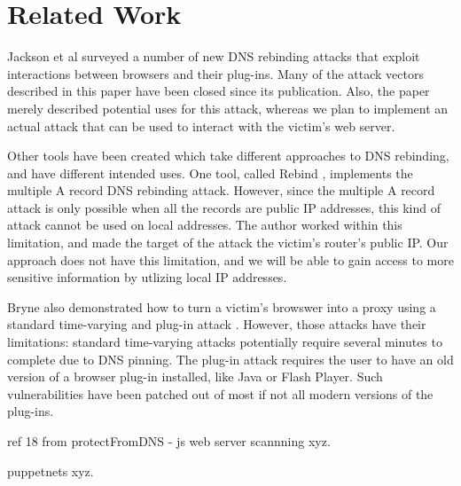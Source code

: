 \section{Related Work}
\label{sec:related}

Jackson et al \cite{protectFromDNS} surveyed a number of new DNS rebinding attacks that exploit interactions between browsers and their plug-ins. Many of the attack vectors described in this paper have been closed since its publication. Also, the paper merely described potential uses for this attack, whereas we plan to implement an actual attack that can be used to interact with the victim's web server.

Other tools have been created which take different approaches to DNS rebinding, and have different intended uses. One tool, called Rebind \cite{rebind}, implements the multiple A record DNS rebinding attack. However, since the multiple A record attack is only possible when all the records are public IP addresses, this kind of attack cannot be used on local addresses. The author worked within this limitation, and made the target of the attack the victim's router's public IP. Our approach does not have this limitation, and we will be able to gain access to more sensitive information by utlizing local IP addresses.

Bryne also demonstrated how to turn a victim's browswer into a proxy using a standard time-varying and plug-in attack \cite{blackhat}. However, those attacks have their limitations: standard time-varying attacks potentially require several minutes to complete due to DNS pinning. The plug-in attack requires the user to have an old version of a browser plug-in installed, like Java or Flash Player. Such vulnerabilities have been patched out of most if not all modern versions of the plug-ins.

ref 18 from protectFromDNS - js web server scannning \cite{grossman} xyz.

puppetnets \cite{puppetnets} xyz.
